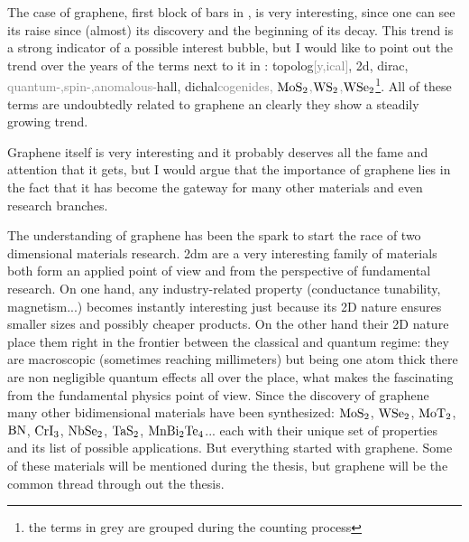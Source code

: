 The case of graphene, first block of bars in , is very interesting, since one can see its raise since (almost) its discovery and the beginning of its decay. This trend is a strong indicator of a possible interest bubble, but I would like to point out the trend over the years of the terms next to it in : topolog\textcolor{gray}{[y,ical]}, 2d, dirac, \textcolor{gray}{quantum-,spin-,anomalous-}hall, dichal\textcolor{gray}{cogenides, $\ce{MoS2}$,$\ce{WS2}$,$\ce{WSe2}$}\footnote{the terms in grey are grouped during the counting process}.
All of these terms are undoubtedly related to graphene an clearly they show a steadily growing trend.
\medskip

Graphene itself is very interesting and it probably deserves all the fame and attention that it gets, but I would argue that the importance of graphene lies in the fact that it has become the gateway for many other materials and even research branches.

The understanding of graphene has been the spark to start the race of two dimensional materials research. \ac{2dm} are a very interesting family of materials both form an applied point of view and from the perspective of fundamental research.
On one hand, any industry-related property (conductance tunability, magnetism...) becomes instantly interesting just because its 2D nature ensures smaller sizes and possibly cheaper products.
On the other hand their 2D nature place them right in the frontier between the classical and quantum regime: they are macroscopic (sometimes reaching millimeters) but being one atom thick there are non negligible quantum effects all over the place, what makes the fascinating from the fundamental physics point of view.
Since the discovery of graphene many other bidimensional materials have been synthesized: $\ce{MoS2}$, $\ce{WSe2}$, $\ce{MoT2}$, $\ce{BN}$, $\ce{CrI3}$, $\ce{NbSe2}$, $\ce{TaS2}$, $\ce{MnBi2Te4}$... each with their unique set of properties and its list of possible applications. But everything started with graphene.
Some of these materials will be mentioned during the thesis, but graphene will be the common thread through out the thesis.


